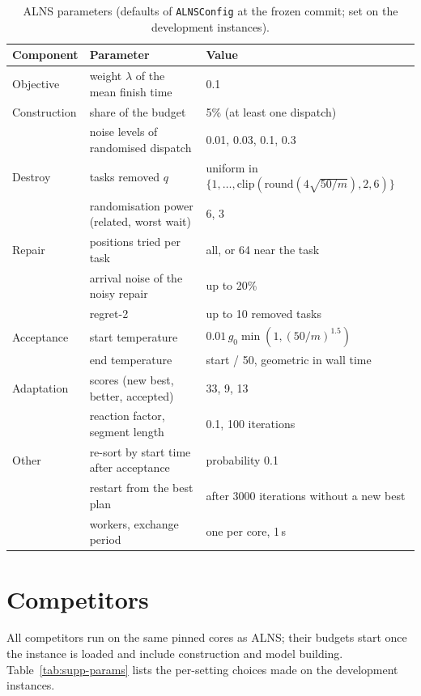 \documentclass[10pt]{article}
\begin{document}
\begin{table}[h]
\centering
\small
\caption{ALNS parameters (defaults of \texttt{ALNSConfig} at the frozen commit; set on the development instances).}
\label{tab:s-alns}
\begin{tabular}{lll}
\toprule
Component & Parameter & Value \\
\midrule
Objective & weight $\lambda$ of the mean finish time & 0.1 \\
Construction & share of the budget & 5\% (at least one dispatch) \\
 & noise levels of randomised dispatch & 0.01, 0.03, 0.1, 0.3 \\
Destroy & tasks removed $q$ & uniform in $\{1, \dots, \mathrm{clip}(\mathrm{round}(4\sqrt{50/m}), 2, 6)\}$ \\
 & randomisation power (related, worst wait) & 6, 3 \\
Repair & positions tried per task & all, or 64 near the task \\
 & arrival noise of the noisy repair & up to 20\% \\
 & regret-2 & up to 10 removed tasks \\
Acceptance & start temperature & $0.01\, g_0 \min(1, (50/m)^{1.5})$ \\
 & end temperature & start / 50, geometric in wall time \\
Adaptation & scores (new best, better, accepted) & 33, 9, 13 \\
 & reaction factor, segment length & 0.1, 100 iterations \\
Other & re-sort by start time after acceptance & probability 0.1 \\
 & restart from the best plan & after 3000 iterations without a new best \\
 & workers, exchange period & one per core, 1\,s \\
\bottomrule
\end{tabular}
\end{table}

\section{Competitors}
\label{sec:s-competitors}

All competitors run on the same pinned cores as ALNS; their budgets start once the instance is loaded and include
construction and model building. Table~\ref{tab:supp-params} lists the per-setting choices made on the development instances.
\end{document}
